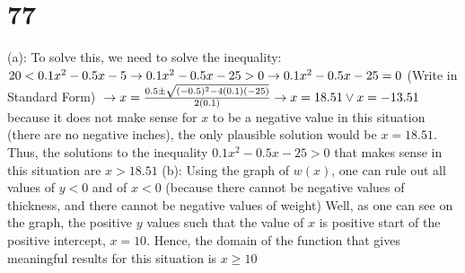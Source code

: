 \documentclass{article}
\theoremstyle{definition}
\begin{document}
\section*{77}
(a): To solve this, we need to solve the inequality: $20<0.1x^2-0.5x-5\newline\rightarrow 
0.1x^2-0.5x-25>0\newline\rightarrow 
0.1x^2-0.5x-25=0$ (Write in Standard Form)
$\newline\rightarrow x=\frac{0.5\pm\sqrt{(-0.5)^2-4(0.1)(-25)}}{2(0.1)}\newline\rightarrow 
x=18.51\vee x=-13.51\newline$ because it does not make sense for $x$ to be a negative value in this situation (there are no negative inches), 
the only plausible solution would be $x=18.51$. Thus, the solutions to the inequality $0.1x^2-0.5x-25>0$ that makes sense in this situation are 
$x>18.51$\newline
(b): Using the graph of $w(x)$, one can rule out all values of $y<0$ and of $x<0$ (because there cannot be negative values of thickness, and there 
cannot be negative values of weight) 
Well, as one can see on the graph, the positive $y$ values such that 
the value of $x$ is positive start of the positive intercept, $x=10$. Hence, the domain of the function that gives meaningful results for this situation is 
$x\ge 10$ 
\end{document}
